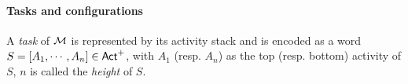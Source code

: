 %	

\paragraph{Tasks and configurations}
A \emph{task} of ${\mathcal{M} }$ is represented by its activity stack and is encoded as a word $S= [A_1, \cdots, A_n] \in {\sf Act}^+$, with $A_1$ (resp. $A_n$) as the top (resp. bottom) activity of $S$, $n$ is called the \emph{height} of $S$. 

